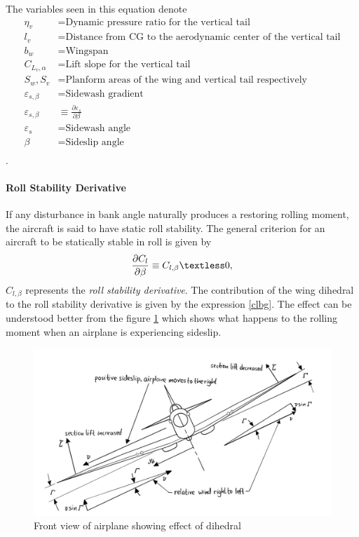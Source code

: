 \documentclass[letterpaper,12pt]{article}
\begin{document}
The variables seen in this equation denote
\begin{align*}
\eta_v&=\text{Dynamic pressure ratio for the vertical tail}\\
l_v&=\text{Distance from CG to the aerodynamic center of the vertical tail}\\
b_w&=\text{Wingspan}\\
C_{L_v,\alpha}&=\text{Lift slope for the vertical tail}\\
S_w, S_v&=\text{Planform areas of the wing and vertical tail respectively}\\
\varepsilon_{s,\beta}&=\text{Sidewash gradient}\\
\varepsilon_{s,\beta}&\equiv\frac{\partial\varepsilon_s}{\partial\beta}\\
\varepsilon_s&=\text{Sidewash angle}\\
\beta&=\text{Sideslip angle}\\
\end{align*}.

\paragraph{Roll Stability Derivative}
If any disturbance in bank angle naturally produces a restoring rolling moment, the aircraft is said to have static roll stability. The general criterion for an aircraft to be statically stable in roll is given by
\begin{equation}
\frac{\partial C_l}{\partial\beta}\equiv C_{l,\beta} \textless 0,
\end{equation}
$C_{l,\beta}$ represents the \textit{roll stability derivative}. The contribution of the wing dihedral to the roll stability derivative is given by the expression \ref{clbg}. The effect can be understood better from the figure \ref{dihedral} which shows what happens to the rolling moment when an airplane is experiencing sideslip.
\begin{figure}[H]
\includegraphics[scale=0.5]{roll_st}
\centering
\caption{Front view of airplane showing effect of dihedral}
\label{dihedral}
\end{figure}
\vspace{10pt}
\end{document}
